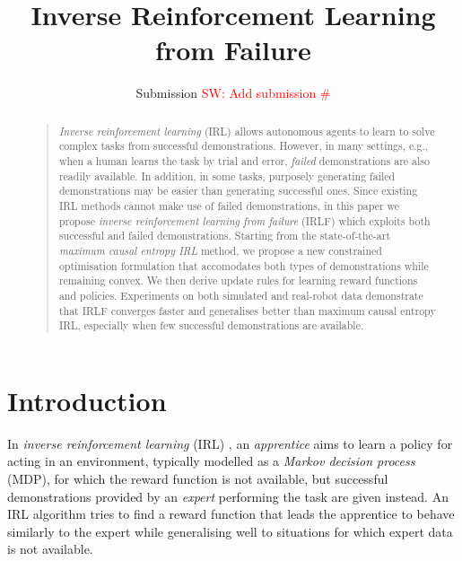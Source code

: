 \documentclass[letterpaper]{article}
\newcommand{\sw}[1]{\textcolor{red}{SW: #1}}
\newcommand{\sw}[1]{}
\begin{document}
%
\title{Inverse Reinforcement Learning from Failure}
\author{Submission \sw{Add submission \#}}
\maketitle
\begin{abstract}
\begin{quote}

\emph{Inverse reinforcement learning} (IRL) allows autonomous agents to learn to solve complex tasks from successful demonstrations.  However, in many settings, e.g., when a human learns the task by trial and error, \emph{failed} demonstrations are also readily available.  In addition, in some tasks, purposely generating failed demonstrations may be easier than generating successful ones.  Since existing IRL methods cannot make use of failed demonstrations, in this paper we propose \emph{inverse reinforcement learning from failure} (IRLF) which exploits both successful and failed demonstrations.  Starting from the state-of-the-art \emph{maximum causal entropy IRL} method, we propose a new constrained optimisation formulation that accomodates both types of demonstrations while remaining convex.  We then derive update rules for learning reward functions and policies. Experiments on both simulated and real-robot data demonstrate that IRLF converges faster and generalises better than maximum causal entropy IRL, especially when few successful demonstrations are available.

\end{quote}
\end{abstract}

\section{Introduction}

In \emph{inverse reinforcement learning} (IRL) \cite{ng2000algorithms}, an \emph{apprentice} aims to learn a policy for acting in an environment, typically modelled as a \emph{Markov decision process} (MDP), for which the reward function is not available, but successful demonstrations provided by an \emph{expert} performing the task are given instead. An IRL algorithm tries to find a reward function that leads the apprentice to behave  similarly to the expert while generalising well to situations for which expert data is not available. 
\end{document}

